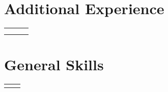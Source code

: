 \documentclass{article}
\begin{document}
    
    
    


\section{Additional Experience}

    \begin{flushleft}
        \begin{tabularx}{\textwidth}{l l R}
                      \\
                         \\
              \\
        \end{tabularx}
    \end{flushleft}


\section{General Skills}

    \begin{flushleft}
        \begin{tabular}{>{\raggedleft\arraybackslash}p{1.25in} >{\raggedright\arraybackslash}p{5.85in}}
             \\
             \\
            
        \end{tabular}
    \end{flushleft}
\end{document}
